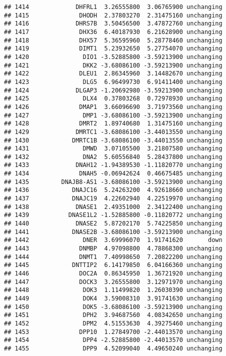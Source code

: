\documentclass[]{article}
\begin{document}
\begin{verbatim}
## 1414             DHFRL1  3.26555800  3.06765900 unchanging
## 1415              DHODH  2.37803270  2.31475160 unchanging
## 1416             DHRS7B  3.50456500  3.47872760 unchanging
## 1417              DHX36  6.40187930  6.21628900 unchanging
## 1418              DHX57  5.36595960  5.28778460 unchanging
## 1419              DIMT1  5.23932650  5.27754070 unchanging
## 1420               DIO1 -3.52885800 -3.59213900 unchanging
## 1421               DKK2 -3.68086100 -3.59213900 unchanging
## 1422              DLEU1  2.86345960  3.14482670 unchanging
## 1423               DLG5  6.96499730  6.91411400 unchanging
## 1424             DLGAP3 -1.20692980 -3.59213900 unchanging
## 1425               DLX4  0.37803268  0.72978930 unchanging
## 1426              DMAP1  3.66096690  3.71973560 unchanging
## 1427               DMP1 -3.68086100 -3.59213900 unchanging
## 1428              DMRT2  1.89740680  1.31475160 unchanging
## 1429             DMRTC1 -3.68086100 -3.44013550 unchanging
## 1430            DMRTC1B -3.68086100 -3.44013550 unchanging
## 1431               DMWD  3.07105500  3.21807580 unchanging
## 1432               DNA2  5.60556840  5.28437800 unchanging
## 1433             DNAH12 -1.94389530 -1.11820770 unchanging
## 1434              DNAH5 -0.06942624  0.46675485 unchanging
## 1435         DNAJB8-AS1 -3.68086100 -3.59213900 unchanging
## 1436            DNAJC16  5.24263200  4.92618660 unchanging
## 1437            DNAJC19  4.22602940  4.22519970 unchanging
## 1438             DNASE1  2.49351000  2.34122400 unchanging
## 1439           DNASE1L2 -1.52885800 -0.11820772 unchanging
## 1440             DNASE2  5.87202170  5.74225850 unchanging
## 1441            DNASE2B -3.68086100 -3.59213900 unchanging
## 1442               DNER  3.69996070  1.91741620       down
## 1443              DNMBP  4.97098800  4.78868300 unchanging
## 1444              DNMT1  7.40998650  7.20822200 unchanging
## 1445            DNTTIP2  6.14179850  6.04166360 unchanging
## 1446              DOC2A  0.86345950  1.36721920 unchanging
## 1447              DOCK3  3.26555800  3.12971970 unchanging
## 1448               DOK3  1.11499820  1.26030390 unchanging
## 1449               DOK4  3.59008310  3.91741630 unchanging
## 1450               DOK5 -3.68086100 -3.59213900 unchanging
## 1451               DPH2  3.94687560  4.08342650 unchanging
## 1452               DPM2  4.51553630  4.39275460 unchanging
## 1453              DPP10  1.27849700 -2.44013570 unchanging
## 1454               DPP4 -2.52885800 -2.44013570 unchanging
## 1455               DPP9  4.52099040  4.49650240 unchanging

\end{verbatim}
\end{document}

